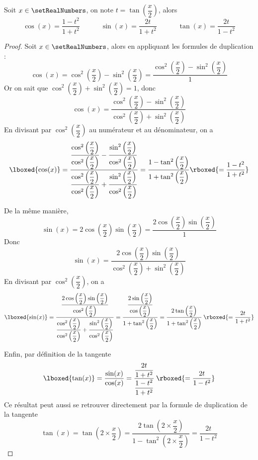 \begin{lemma}
\label{trigonometrie:arc_moitie}
Soit $x \in \setRealNumbers$, on note $t = \tan\left(\dfrac{x}{2}\right)$, alors 
\[
\cos(x) = \dfrac{1-t^2}{1+t^2}
\qquad\quad
\sin(x)= \dfrac{2t}{1+t^2}
\qquad\quad
\tan(x) = \dfrac{2t}{1-t^2}
\]
\end{lemma}

\begin{proof}
Soit $x \in \setRealNumbers$, alors en appliquant les formules de duplication :
\[
\cos(x) 
= \cos^2\left(\dfrac{x}{2}\right)-\sin^2\left(\dfrac{x}{2}\right) 
= \dfrac{\cos^2\left(\dfrac{x}{2}\right)-\sin^2\left(\dfrac{x}{2}\right)}{1}
\]
Or on sait que $\cos^2\left(\dfrac{x}{2}\right)+\sin^2\left(\dfrac{x}{2}\right) = 1$, donc
\[
\cos(x)=\dfrac{\cos^2\left(\dfrac{x}{2}\right)-\sin^2\left(\dfrac{x}{2}\right)}{\cos^2\left(\dfrac{x}{2}\right)+\sin^2\left(\dfrac{x}{2}\right)}
\]
En divisant par $\cos^2\left(\dfrac{x}{2}\right)$ au numérateur et au dénominateur, on a 
\[
\lboxed{\cos(x)}
=\dfrac{\dfrac{\cos^2\left(\dfrac{x}{2}\right)}{\cos^2\left(\dfrac{x}{2}\right)}-\dfrac{\sin^2\left(\dfrac{x}{2}\right)}{\cos^2\left(\dfrac{x}{2}\right)}}{\dfrac{\cos^2\left(\dfrac{x}{2}\right)}{\cos^2\left(\dfrac{x}{2}\right)}+\dfrac{\sin^2\left(\dfrac{x}{2}\right)}{\cos^2\left(\dfrac{x}{2}\right)}}
=\dfrac{1-\tan^2\left(\dfrac{x}{2}\right)}{1+\tan^2\left(\dfrac{x}{2}\right)}
\rboxed{=\dfrac{1-t^2}{1+t^2}}
\]

De la même manière,
\[
\sin(x) = 2\cos\left(\dfrac{x}{2}\right)\sin\left(\dfrac{x}{2}\right) =\dfrac{2\cos\left(\dfrac{x}{2}\right)\sin\left(\dfrac{x}{2}\right)}{1}
\]
Donc 
\[
\sin(x) =\dfrac{2\cos\left(\dfrac{x}{2}\right)\sin\left(\dfrac{x}{2}\right)}{\cos^2\left(\dfrac{x}{2}\right)+\sin^2\left(\dfrac{x}{2}\right)}
\]
En divisant par $\cos^2\left(\dfrac{x}{2}\right)$, on a 
\[
\lboxed{\sin(x)} =
\dfrac{\dfrac{2\cos\left(\dfrac{x}{2}\right)\sin\left(\dfrac{x}{2}\right)}{\cos^2\left(\dfrac{x}{2}\right)}}{\dfrac{\cos^2\left(\dfrac{x}{2}\right)}{\cos^2\left(\dfrac{x}{2}\right)}+\dfrac{\sin^2\left(\dfrac{x}{2}\right)}{\cos^2\left(\dfrac{x}{2}\right)}}
=\dfrac{\dfrac{2\sin\left(\dfrac{x}{2}\right)}{\cos\left(\dfrac{x}{2}\right)}}{1+\tan^2\left(\dfrac{x}{2}\right)}
= \dfrac{2\tan\left(\dfrac{x}{2}\right)}{1+\tan^2\left(\dfrac{x}{2}\right)}
\:\rboxed{= \dfrac{2t}{1+t^2}}
\]

Enfin, par définition de la tangente
\[
\lboxed{\tan(x)}
=\dfrac{\sin(x)}{\cos(x)} 
= \dfrac{\dfrac{2t}{1+t^2}}{\dfrac{1-t^2}{1+t^2}} 
\:\rboxed{= \dfrac{2t}{1-t^2}}
\]
Ce résultat peut aussi se retrouver directement par la formule de duplication de la tangente
\[
\tan(x)
=\tan\left(2 \times \dfrac{x}{2}\right)
=\dfrac{2\tan\left(2 \times \dfrac{x}{2}\right)}{1 - \tan^2\left(2 \times \dfrac{x}{2}\right)} 
= \dfrac{2t}{1-t^2}
\]
\end{proof}